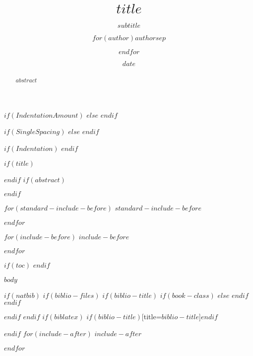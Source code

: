 \documentclass[$if(fontsize)$$fontsize$$else$12pt$endif$,$if(lang)$$lang$,$endif$$if(papersize)$$papersize$$else$letterpaper$endif$$for(classoption)$,$classoption$$sep$$endfor$]{$if(documentclass)$$documentclass$$else$article$endif$}
\title{$title$}
\subtitle{$subtitle$}
\author{$for(author)$$author$$sep$ \and $endfor$}
\date{$date$}
\newcommand{\myfontsize}{$if(fontsize)$$fontsize$$else$12pt$endif$}
\newlength{\backup}
\begin{document}
\renewcommand*\familydefault{\sfdefault}
\normalfont
\ifthenelse{\lengthtest{\backup<0pt}}{\addtolength{\backup}{-2\baselineskip}\vspace*{\backup}\par}{}

\newlength{\myindentamount}
$if(IndentationAmount)$
\setlength{\myindentamount}{$IndentationAmount$}
$else$
\setlength{\myindentamount}{0.5in}
$endif$

$if(SingleSpacing)$
\setlength{\parskip}{\myfontsize}
$else$
\doublespacing
\setlength{\parindent}{\myindentamount}
\setlength{\RaggedRightParindent}{\parindent}
$endif$

$if(Indentation)$
\setlength{\parindent}{\myindentamount}
\setlength{\RaggedRightParindent}{\parindent}
$endif$

$if(title)$
\maketitle
$endif$
$if(abstract)$
\begin{abstract}
$abstract$
\end{abstract}
$endif$

$for(standard-include-before)$
$standard-include-before$

$endfor$

$for(include-before)$
$include-before$

$endfor$

$if(toc)$
{
\hypersetup{linkcolor=black}
\setcounter{tocdepth}{$toc-depth$}
\tableofcontents
}
$endif$
\thispagestyle{firststyle}

$body$

$if(natbib)$
$if(biblio-files)$
$if(biblio-title)$
$if(book-class)$
\renewcommand\bibname{$biblio-title$}
$else$
\renewcommand\refname{$biblio-title$}
$endif$
$endif$


$endif$
$endif$
$if(biblatex)$
\printbibliography$if(biblio-title)$[title=$biblio-title$]$endif$

$endif$
$for(include-after)$
$include-after$

$endfor$
\end{document}
